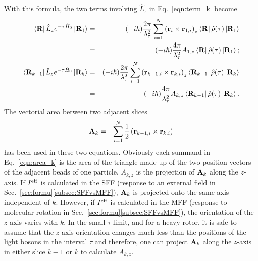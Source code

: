 \documentclass[12pt]{iopart}
\begin{document}
With this formula, the two terms involving $\hat{L}_z$ in Eq.~\ref{eqn:term_k} become
\begin{eqnarray}
\left<{\bf R}\right|\hat{L}_ze^{-\tau\hat{H}_0}\left|{\bf R}_1\right>&=&(-i\hbar)\frac{2\pi}{\lambda_\tau^2} \sum_{i=1}^N\left({\bf r}_i\times{\bf r}_{1,i} \right)_z\left<{\bf R}\right|\hat{\rho}(\tau)\left|{\bf R}_1\right>\nonumber\\
&=&(-i\hbar)\frac{4\pi}{\lambda_\tau^2}A_{1,z}\left<{\bf R}\right|\hat{\rho}(\tau)\left|{\bf R}_1\right>; \label{eqn:rlzr1}\\
\left<{\bf R}_{k-1}\right|\hat{L}_ze^{-\tau\hat{H}_0}\left|{\bf R}_k\right>&=&(-i\hbar)\frac{2\pi}{\lambda_\tau^2} \sum_{i=1}^N\left({\bf r}_{k-1,i}\times{\bf r}_{k,i} \right)_z\left<{\bf R}_{k-1}\right|\hat{\rho}(\tau)\left|{\bf R}_k\right> \nonumber\\
&=&(-i\hbar)\frac{4\pi}{\lambda_\tau^2}A_{k,z}\left<{\bf R}_{k-1}\right|\hat{\rho}(\tau)\left|{\bf R}_k\right>. \label{eqm:rklz}
\end{eqnarray}
The vectorial area between two adjacent slices
\begin{eqnarray}
{\bf A}_{k}&=&\sum_{i=1}^N\frac{1}{2}\left({\bf r}_{k-1,i}\times{\bf r}_{k,i} \right) \label{eqn:area_k}
\end{eqnarray}
has been used in these two equations. 
Obviously each summand in Eq.~\ref{eqn:area_k} is the area of the triangle made up of the two position vectors of the adjacent beads of one particle. 
$A_{k,z}$ is the projection of ${\bf A}_k$ along the $z$-axis. 
If $I^{\rm eff}$ is calculated in the SFF (response to an external field in Sec.~\ref{sec:formu}\ref{subsec:SFFvsMFF}), $
{\bf A}_k$ is projected onto the same axis independent of $k$. 
However, if $I^{\rm eff}$ is calculated in the MFF (response to molecular rotation in Sec.~\ref{sec:formu}\ref{subsec:SFFvsMFF}), 
the orientation of the $z$-axis varies with $k$. 
In the small $\tau$ limit, and for a heavy rotor, it is safe to assume that the $z$-axis orientation changes much less than the positions of the light bosons in the interval $\tau$ and 
therefore, one can project ${\bf A}_{k}$ along the $z$-axis in either slice $k-1$ or $k$ to calculate $A_{k,z}$.
\end{document}
